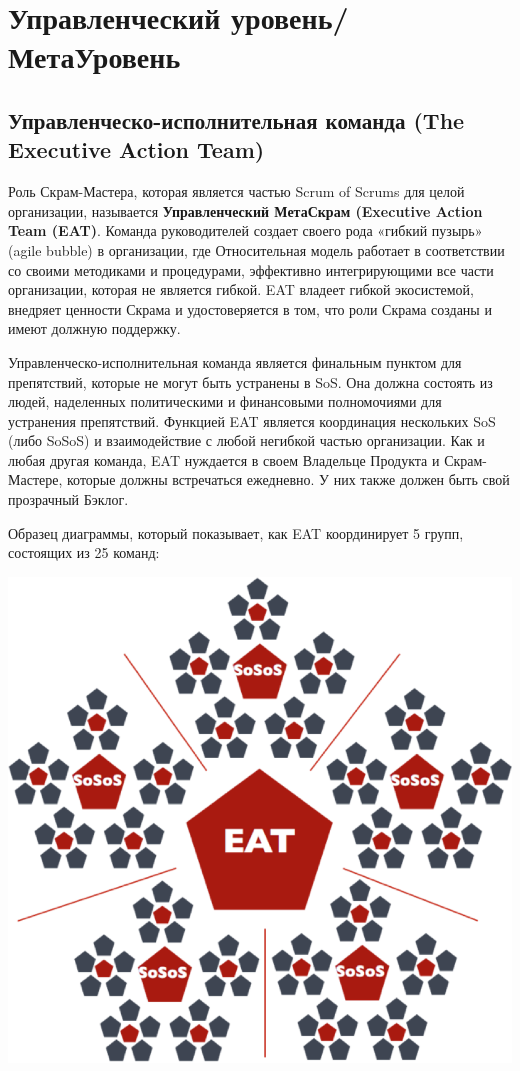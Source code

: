 \documentclass[12pt,a4paper,parskip=full]{scrartcl}
\begin{document}
\section{Управленческий уровень/МетаУровень}

\subsection{Управленческо-исполнительная команда (The Executive Action Team)}

Роль Скрам-Мастера, которая является частью Scrum of Scrums для целой организации, называется \textbf{Управленческий МетаСкрам (Executive Action Team (EAT)}. Команда руководителей создает своего рода «гибкий пузырь» (agile bubble) в организации, где Относительная модель работает в соответствии со своими методиками и процедурами, эффективно интегрирующими все части организации, которая не является гибкой. EAT владеет гибкой экосистемой, внедряет ценности Скрама и удостоверяется в том, что роли Скрама созданы и имеют должную поддержку. 

Управленческо-исполнительная команда является финальным пунктом для препятствий, которые не могут быть устранены в SoS. Она должна состоять из людей, наделенных политическими и финансовыми полномочиями для устранения препятствий. Функцией EAT является координация нескольких SoS (либо SoSoS) и взаимодействие с любой негибкой частью организации. Как и любая другая команда, EAT нуждается в своем Владельце Продукта и Скрам-Мастере, которые должны встречаться ежедневно. У них также должен быть свой прозрачный Бэклог. 

Образец диаграммы, который показывает, как EAT координирует 5 групп, состоящих из 25 команд: 

\includegraphics[width=\textwidth,height=\textheight,keepaspectratio]{SoS-EAT.png}
\end{document}
